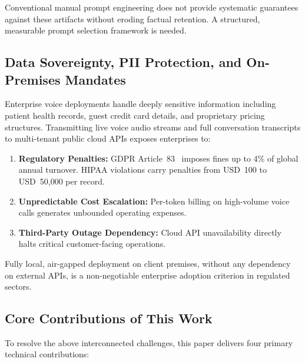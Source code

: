 \documentclass[11pt,a4paper]{article}
\begin{document}
Conventional manual prompt engineering does not provide systematic guarantees against these artifacts without eroding factual retention. A structured, measurable prompt selection framework is needed.

\subsection{Data Sovereignty, PII Protection, and On-Premises Mandates}
\label{subsec:data_sovereignty}

Enterprise voice deployments handle deeply sensitive information including patient health records, guest credit card details, and proprietary pricing structures. Transmitting live voice audio streams and full conversation transcripts to multi-tenant public cloud APIs exposes enterprises to:

\begin{enumerate}[leftmargin=*]
    \item \textbf{Regulatory Penalties:} GDPR Article~83~\cite{sandnes2020gdpr} imposes fines up to 4\% of global annual turnover. HIPAA violations carry penalties from USD~100 to USD~50,000 per record.
    \item \textbf{Unpredictable Cost Escalation:} Per-token billing on high-volume voice calls generates unbounded operating expenses.
    \item \textbf{Third-Party Outage Dependency:} Cloud API unavailability directly halts critical customer-facing operations.
\end{enumerate}

Fully local, air-gapped deployment on client premises, without any dependency on external APIs, is a non-negotiable enterprise adoption criterion in regulated sectors.

\subsection{Core Contributions of This Work}
\label{subsec:contributions}

To resolve the above interconnected challenges, this paper delivers four primary technical contributions:
\end{document}
